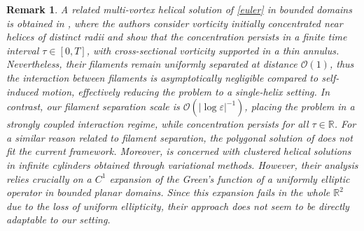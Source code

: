 \documentclass[11pt,reqno,a4paper]{amsart}
\numberwithin{equation}{section}
\newcommand{\R}{\mathbb{R}}
\newcommand{\ve}{\varepsilon}
\newtheorem{remark}{Remark}[section]
\begin{document}
\begin{remark}
A related multi-vortex helical solution of \eqref{euler} in bounded domains is obtained in \cite{donati2024dynamics}, where the authors consider vorticity initially concentrated near helices of distinct radii and show that the concentration persists in a finite time interval $\tau \in [0,T]$, with cross-sectional vorticity supported in a thin annulus. Nevertheless, their filaments remain uniformly separated at distance $\mathcal{O}(1)$, thus the interaction between filaments is asymptotically negligible compared to self-induced motion, effectively reducing the problem to a single-helix setting. In contrast, our filament separation scale is $\mathcal{O}(|\log\ve|^{-1})$, placing the problem in a strongly coupled interaction regime, while concentration persists for all $\tau \in\R$. For a similar reason related to filament separation, the polygonal solution of \cite{MR5036920} does not fit the current framework. Moreover, \cite{cao2023clustered} is concerned with clustered helical solutions in infinite cylinders obtained through variational methods. However, their analysis relies crucially on a $C^{1}$ expansion of the Green’s function of a uniformly elliptic operator in bounded planar domains. Since this expansion fails in the whole $\R^2$ due to the loss of uniform ellipticity, their approach does not seem to be directly adaptable to our setting.
\end{remark}
\end{document}
